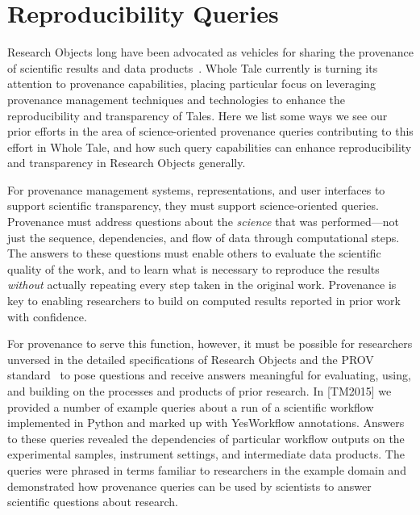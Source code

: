 \section{Reproducibility Queries}\label{sec-transparency}

Research Objects long have been advocated as vehicles for sharing the 
	provenance of scientific results and data products~\cite{bechhofer2013whya}.
Whole Tale currently is turning its attention to provenance capabilities, placing particular
	focus on leveraging provenance management techniques and technologies
	to enhance the reproducibility and transparency of Tales.
Here we list some ways we see our prior efforts in the area
	of science-oriented provenance queries contributing to this effort in Whole Tale,
	and how such query capabilities can enhance reproducibility and transparency in 
	Research Objects generally.

For provenance management systems, representations, and user interfaces to support 
	scientific transparency, they must support science-oriented queries.
Provenance must address questions about the \emph{science} that was performed---not just the
	sequence, dependencies, and flow of data through computational steps.
The answers to these questions must enable others to evaluate the scientific quality of the work, 
	and to learn what is necessary to
	reproduce the results \emph{without} actually repeating every step taken in the original work.
Provenance is key to enabling researchers to build on computed results reported in prior work with confidence.

For provenance to serve this function, however, it must be possible for researchers unversed in the detailed
	specifications of Research Objects and the PROV standard~\cite{groth2013provoverviewa} to pose 
	questions and receive answers meaningful for evaluating, using, and building on the
	processes and products of prior research. 
In [TM2015] we provided a number of example queries about a run of a scientific
	workflow implemented in Python and marked up with YesWorkflow annotations.
Answers to these queries revealed the dependencies of particular workflow outputs
	on the experimental samples, instrument settings, and intermediate data products.
The queries were phrased in terms familiar to researchers  in the example domain
	and demonstrated how provenance queries can be used by scientists
	to answer scientific questions about research.

